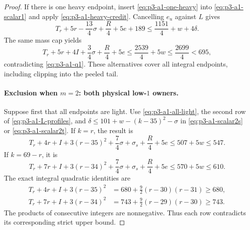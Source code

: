 \documentclass[11pt,letterpaper]{article}
\theoremstyle{definition}\newtheorem{definition}[theorem]{Definition}
\begin{document}
\begin{proof}
If there is one heavy endpoint, insert \eqref{eq:p3-a1-one-heavy}
into \eqref{eq:p3-a1-scalar1} and apply
\eqref{eq:p3-a1-heavy-credit}. Cancelling $e_u$ against $L$ gives
\[
 T_r+5r-\frac{13}{4}\sigma+\frac R4+5e+189
 \le\frac{1151}{4}+w+4\delta.
\]
The same mass cap yields
\begin{equation}\label{eq:p3-a1-m1-heavy-final}
 T_r+5r+4I+\frac34\sigma+\frac R4+5e
 \le\frac{2539}{4}+5w\le\frac{2699}{4}<695,
\end{equation}
contradicting \eqref{eq:p3-a1-q1}. These alternatives cover all
integral endpoints, including clipping into the peeled tail.

\paragraph{Exclusion when $m=2$: both physical low-$1$ owners.}
Suppose first that all endpoints are light. Use
\eqref{eq:p3-a1-all-light}, the second row of
\eqref{eq:p3-a1-L-profiles}, and
$\delta\le101+w-(k-35)^2-\sigma$ in
\eqref{eq:p3-a1-scalar2s} or \eqref{eq:p3-a1-scalar2t}.
If $k=r$, the result is
\begin{equation}\label{eq:p3-a1-m2s-light-final}
 T_r+4r+I+3(r-35)^2+\frac74\sigma+\sigma_s+\frac R4+5e
 \le507+5w\le547.
\end{equation}
If $k=69-r$, it is
\begin{equation}\label{eq:p3-a1-m2t-light-final}
 T_r+7r+I+3(r-34)^2+\frac74\sigma+\sigma_s+\frac R4+5e
 \le570+5w\le610.
\end{equation}
The exact integral quadratic identities are
\begin{align}
 T_r+4r+I+3(r-35)^2
 &=680+\frac92(r-30)(r-31)\ge680,\label{eq:p3-a1-q2s-light}\\
 T_r+7r+I+3(r-34)^2
 &=743+\frac92(r-29)(r-30)\ge743.\label{eq:p3-a1-q2t-light}
\end{align}
The products of consecutive integers are nonnegative. Thus each row
contradicts its corresponding strict upper bound.


\end{proof}
\end{document}
